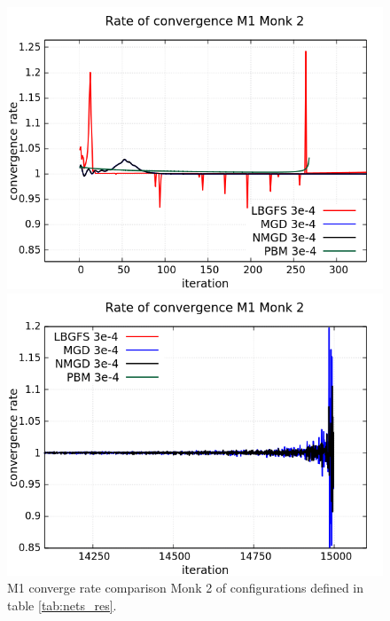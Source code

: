 \begin{figure}[H]
	\centering
	\begin{minipage}[t]{0.525\linewidth}		
		\includegraphics[width=\linewidth]{data/Comparison/Monk2/Monk2_M1_CR_zoomLeft.png}
	\end{minipage}%
	\begin{minipage}[t]{0.525\linewidth}
		\includegraphics[width=\linewidth]{data/Comparison/Monk2/Monk2_M1_CR_zoomRight.png}
	\end{minipage}
	\caption{M1 converge rate comparison Monk 2 of configurations defined in table \ref{tab:nets_res}.}
	\label{fig:CR-M1-Monk2-Zoom}
\end{figure}

